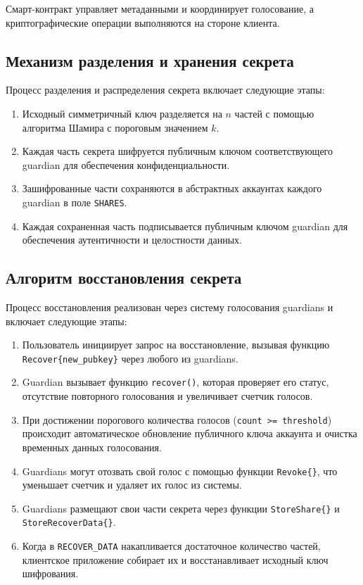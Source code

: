 Смарт-контракт управляет метаданными и координирует голосование, а криптографические операции выполняются на стороне клиента.

\subsection{Механизм разделения и хранения секрета}

Процесс разделения и распределения секрета включает следующие этапы:

\begin{enumerate}
\item
Исходный симметричный ключ разделяется на $n$ частей с помощью алгоритма Шамира с пороговым значением $k$.

\item
Каждая часть секрета шифруется публичным ключом соответствующего guardian для обеспечения конфиденциальности.

\item
Зашифрованные части сохраняются в абстрактных аккаунтах каждого guardian в поле \texttt{SHARES}.

\item
Каждая сохраненная часть подписывается публичным ключом guardian для обеспечения аутентичности и целостности данных.
\end{enumerate}

\subsection{Алгоритм восстановления секрета}

Процесс восстановления реализован через систему голосования guardians и включает следующие этапы:

\begin{enumerate}
\item
Пользователь инициирует запрос на восстановление, вызывая функцию \texttt{Recover\{new\_pubkey\}} через любого из guardians.

\item
Guardian вызывает функцию \texttt{recover()}, которая проверяет его статус, отсутствие повторного голосования и увеличивает счетчик голосов.

\item
При достижении порогового количества голосов (\texttt{count >= threshold}) происходит автоматическое обновление публичного ключа аккаунта и очистка временных данных голосования.

\item
Guardians могут отозвать свой голос с помощью функции \texttt{Revoke\{\}}, что уменьшает счетчик и удаляет их голос из системы.

\item
Guardians размещают свои части секрета через функции \texttt{StoreShare\{\}} и \texttt{StoreRecoverData\{\}}.

\item
Когда в \texttt{RECOVER\_DATA} накапливается достаточное количество частей, клиентское приложение собирает их и восстанавливает исходный ключ шифрования.
\end{enumerate}

